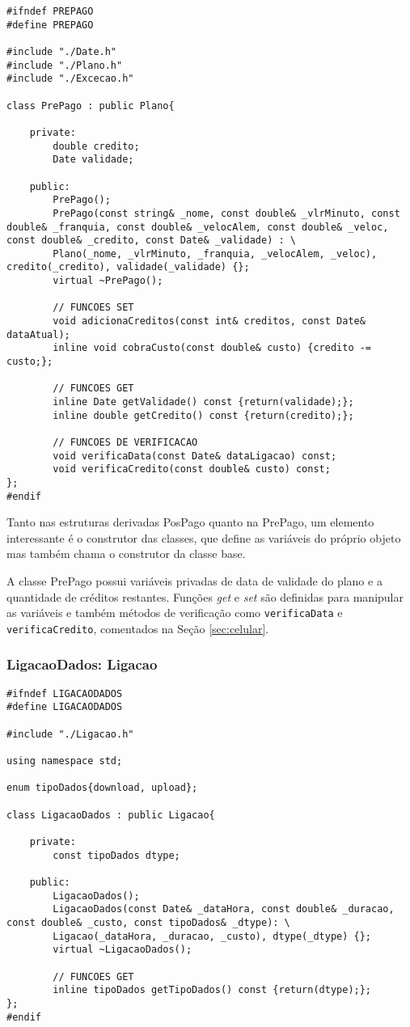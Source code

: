 \begin{lstlisting}[basicstyle=\tiny]
#ifndef PREPAGO
#define PREPAGO

#include "./Date.h"
#include "./Plano.h"
#include "./Excecao.h"

class PrePago : public Plano{

	private:    
		double credito;
		Date validade;

	public:
		PrePago();
		PrePago(const string& _nome, const double& _vlrMinuto, const double& _franquia, const double& _velocAlem, const double& _veloc, const double& _credito, const Date& _validade) : \
		Plano(_nome, _vlrMinuto, _franquia, _velocAlem, _veloc), credito(_credito), validade(_validade) {};
		virtual ~PrePago();
		
		// FUNCOES SET
		void adicionaCreditos(const int& creditos, const Date& dataAtual);
		inline void cobraCusto(const double& custo) {credito -= custo;};
		
		// FUNCOES GET
		inline Date getValidade() const {return(validade);};
		inline double getCredito() const {return(credito);};
		
		// FUNCOES DE VERIFICACAO
		void verificaData(const Date& dataLigacao) const;
		void verificaCredito(const double& custo) const;
};
#endif
\end{lstlisting}

Tanto nas estruturas derivadas PosPago quanto na PrePago, um elemento interessante é o construtor das classes, que define as variáveis do próprio objeto mas também chama o construtor da classe base. 

A classe PrePago possui variáveis privadas de data de validade do plano e a quantidade de créditos restantes. Funções \textit{get} e \textit{set} são definidas para manipular as variáveis e também métodos de verificação como \texttt{verificaData} e \texttt{verificaCredito}, comentados na Seção \ref{sec:celular}.

\pagebreak


\subsubsection{LigacaoDados: Ligacao} \label{sec:ligacaodados}

\begin{lstlisting}[basicstyle=\tiny]
#ifndef LIGACAODADOS
#define LIGACAODADOS

#include "./Ligacao.h"

using namespace std;

enum tipoDados{download, upload};

class LigacaoDados : public Ligacao{

	private:
		const tipoDados dtype;

	public:
		LigacaoDados();
		LigacaoDados(const Date& _dataHora, const double& _duracao, const double& _custo, const tipoDados& _dtype): \
		Ligacao(_dataHora, _duracao, _custo), dtype(_dtype) {};
		virtual ~LigacaoDados();
		
		// FUNCOES GET
		inline tipoDados getTipoDados() const {return(dtype);};
};
#endif
\end{lstlisting}

